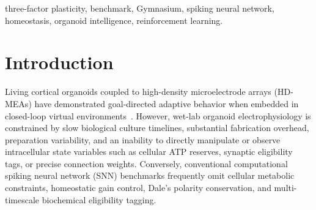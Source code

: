 \documentclass[journal]{IEEEtran}
\begin{document}
\begin{IEEEkeywords}
three-factor plasticity, benchmark, Gymnasium, spiking neural network, homeostasis, organoid intelligence, reinforcement learning.
\end{IEEEkeywords}

\section{Introduction}
Living cortical organoids coupled to high-density microelectrode arrays (HD-MEAs) have demonstrated goal-directed adaptive behavior when embedded in closed-loop virtual environments~\cite{Kagan2022DishBrain,Cai2023Brainoware,Smirnova2023OI}. However, wet-lab organoid electrophysiology is constrained by slow biological culture timelines, substantial fabrication overhead, preparation variability, and an inability to directly manipulate or observe intracellular state variables such as cellular ATP reserves, synaptic eligibility tags, or precise connection weights. Conversely, conventional computational spiking neural network (SNN) benchmarks frequently omit cellular metabolic constraints, homeostatic gain control, Dale's polarity conservation, and multi-timescale biochemical eligibility tagging.
\end{document}
